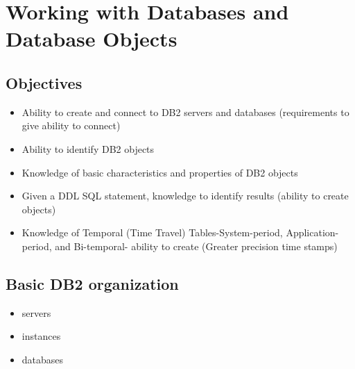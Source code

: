 \documentclass{article}
\begin{document}
\newpage

\section{Working with Databases and Database Objects}

\subsection{Objectives}
\begin{itemize}
\item Ability to create and connect to DB2 servers and databases (requirements to give ability to connect)
\item Ability to identify DB2 objects
\item Knowledge of basic characteristics and properties of DB2 objects
\item Given a DDL SQL statement, knowledge to identify results (ability to create objects)
\item Knowledge of Temporal (Time Travel) Tables-System-period, Application-period, and Bi-temporal-
ability to create (Greater precision time stamps)
\end{itemize}

\subsection{Basic DB2 organization}
\begin{itemize}
\item servers
\item instances
\item databases
\end{itemize}
\end{document}
